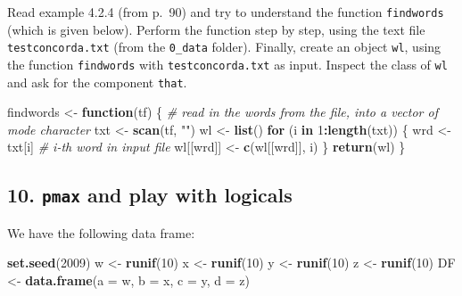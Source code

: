 \documentclass[]{article}
\newenvironment{Shaded}{\begin{snugshade}}{\end{snugshade}}
\newcommand{\CommentTok}[1]{\textcolor[rgb]{0.56,0.35,0.01}{\textit{#1}}}
\newcommand{\ControlFlowTok}[1]{\textcolor[rgb]{0.13,0.29,0.53}{\textbf{#1}}}
\newcommand{\DataTypeTok}[1]{\textcolor[rgb]{0.13,0.29,0.53}{#1}}
\newcommand{\DecValTok}[1]{\textcolor[rgb]{0.00,0.00,0.81}{#1}}
\newcommand{\KeywordTok}[1]{\textcolor[rgb]{0.13,0.29,0.53}{\textbf{#1}}}
\newcommand{\NormalTok}[1]{#1}
\newcommand{\OperatorTok}[1]{\textcolor[rgb]{0.81,0.36,0.00}{\textbf{#1}}}
\newcommand{\StringTok}[1]{\textcolor[rgb]{0.31,0.60,0.02}{#1}}
\begin{document}
Read example 4.2.4 (from p.~90) and try to understand the function
\texttt{findwords} (which is given below). Perform the function step by
step, using the text file \texttt{testconcorda.txt} (from the
\texttt{0\_data} folder). Finally, create an object \texttt{wl}, using
the function \texttt{findwords} with \texttt{testconcorda.txt} as input.
Inspect the class of \texttt{wl} and ask for the component
\texttt{that}.

\begin{Shaded}
\begin{Highlighting}[]
\NormalTok{findwords <-}\StringTok{ }\ControlFlowTok{function}\NormalTok{(tf) \{}
   \CommentTok{# read in the words from the file, into a vector of mode character}
\NormalTok{   txt <-}\StringTok{ }\KeywordTok{scan}\NormalTok{(tf, }\StringTok{""}\NormalTok{)  }
\NormalTok{   wl <-}\StringTok{ }\KeywordTok{list}\NormalTok{()  }
   \ControlFlowTok{for}\NormalTok{ (i }\ControlFlowTok{in} \DecValTok{1}\OperatorTok{:}\KeywordTok{length}\NormalTok{(txt)) \{}
\NormalTok{      wrd <-}\StringTok{ }\NormalTok{txt[i]  }\CommentTok{# i-th word in input file}
\NormalTok{      wl[[wrd]] <-}\StringTok{ }\KeywordTok{c}\NormalTok{(wl[[wrd]], i)  }
\NormalTok{   \}  }
   \KeywordTok{return}\NormalTok{(wl)}
\NormalTok{\}}
\end{Highlighting}
\end{Shaded}

\hypertarget{pmax-and-play-with-logicals}{%
\subsection{\texorpdfstring{10. \texttt{pmax} and play with
logicals}{10. pmax and play with logicals}}\label{pmax-and-play-with-logicals}}

We have the following data frame:

\begin{Shaded}
\begin{Highlighting}[]
\KeywordTok{set.seed}\NormalTok{(}\DecValTok{2009}\NormalTok{) }
\NormalTok{w <-}\StringTok{ }\KeywordTok{runif}\NormalTok{(}\DecValTok{10}\NormalTok{) }
\NormalTok{x <-}\StringTok{ }\KeywordTok{runif}\NormalTok{(}\DecValTok{10}\NormalTok{) }
\NormalTok{y <-}\StringTok{ }\KeywordTok{runif}\NormalTok{(}\DecValTok{10}\NormalTok{) }
\NormalTok{z <-}\StringTok{ }\KeywordTok{runif}\NormalTok{(}\DecValTok{10}\NormalTok{) }
\NormalTok{DF <-}\StringTok{ }\KeywordTok{data.frame}\NormalTok{(}\DataTypeTok{a =}\NormalTok{ w, }\DataTypeTok{b =}\NormalTok{ x, }\DataTypeTok{c =}\NormalTok{ y, }\DataTypeTok{d =}\NormalTok{ z) }
\end{Highlighting}
\end{Shaded}
\end{document}

